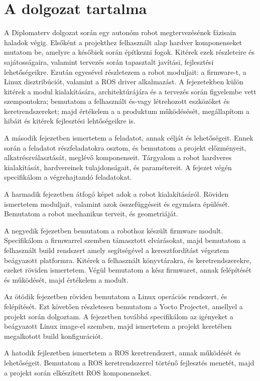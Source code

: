 \section{A dolgozat tartalma}

A Diplomaterv dolgozat során egy autonóm robot megtervezésének fázisain haladok
végig. Elsőként a projekthez felhasznált alap hardver komponenseket mutatom be,
amelyre a későbiek során építkezni fogok. Kitérek ezek részleteire és
sajátosságaira, valamint tervezés során tapasztalt javítási, fejlesztési
lehetőségeikre. Ezután egyesével részletezem a robot moduljait: a firmware-t, a
Linux disztribúciót, valamint a ROS driver alkalmazást. A fejezetekben külön
kitérek a modul kialakítására, architektúrájára és a tervezés során figyelembe
vett szempontokra; bemutatom a felhasznált és-vagy létrehozott eszközöket és
keretrendszereket; majd értékelem a a produktum működésését, megállapítom a
hibáit és kitérek fejlesztési lehtőségeikre is.

A második fejezetben ismertetem a feladatot, annak célját és lehetőségeit. Ennek
során a feladatot részfeladatokra osztom, és bemutatom a projekt előzményeit,
alkatrészválasztását, meglévő komponenseit. Tárgyalom a robot hardveres
kialakítását, hardvereinek tulajdonságait, és paramétereit. A fejezet végén
specifikálom a végrehajtandó feladatokat.

A harmadik fejezetben átfogó képet adok a robot kialakításáról. Röviden
ismertetem moduljait, valamint azok összefüggéseit és egymásra
épülését. Bemutatom a robot mechanikus terveit, és geometriáját.

A negyedik fejezetben bemutatom a robothoz készült firmware modult. Specifikálom
a firmwarrel szemben támasztott elvárásokat, majd bemutatom a felhasznált build
rendszert amely segítségével a keresztfordítást végeztem beágyazott
platformra. Kitérek a felhasznált könyvtárakra, és keretrendszerekre, ezeket
röviden ismertetem. Végül bemutatom a kész firmwaret, annak felépítését és
működését, majd értékelem a modult.

Az ötödik fejezetben röviden bemutatom a Linux operációs rendszert, és
felépítését. Ezt követően részletesen bemutatom a Yocto Projectet, amellyel a
projekt során dolgoztam. A fejezetben továbbá specifikálom az igényeket a
beágyazott Linux image-el szemben, majd ismertetem a projekt keretében
megalkotott build konfigurációt.

A hatodik fejlezetben ismertetem a ROS keretrendszert, annak működését és
lehetőségeit. Bemutatom a ROS keretrendszerrel történő fejlesztés menetét, majd a
projekt során elkészített ROS komponenseket.


